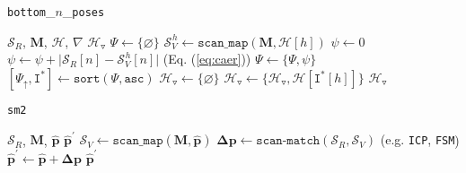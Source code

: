 \begin{algorithm}
  \caption{\texttt{bottom}\_$n$\_\texttt{poses}}
  \begin{spacing}{1.2}
  \begin{algorithmic}[1]
    \REQUIRE $\mathcal{S}_R$, $\bm{M}$, $\mathcal{H}$, $\nabla$
    \ENSURE $\mathcal{H}_{\triangledown}$
    \STATE $\Psi \leftarrow \{\varnothing \}$
      \STATE $\mathcal{S}_V^{\hspace{1pt} h} \leftarrow \texttt{scan\_map}(\bm{M}, \mathcal{H}[h])$
      \STATE $\psi \leftarrow 0$
        \STATE $\psi \leftarrow \psi + \big|\mathcal{S}_R[n]-\mathcal{S}_V^{\hspace{1pt} h}[n]\big|$ \hfill {\small (Eq. (\ref{eq:caer})})
      \ENDFOR
      \STATE $\Psi \leftarrow \{\Psi, \psi\}$
    \ENDFOR
    \STATE $[\Psi_{\uparrow}, \texttt{I}^{\ast}] \leftarrow \texttt{sort}(\Psi, \texttt{asc})$
    \STATE $\mathcal{H}_{\triangledown} \leftarrow \{\varnothing \}$
      \STATE $\mathcal{H}_{\triangledown} \leftarrow \{\mathcal{H}_{\triangledown}, \mathcal{H}[\texttt{I}^{\ast}[h]]\}$
    \ENDFOR
    \RETURN $\mathcal{H}_{\triangledown}$
  \end{algorithmic}
  \end{spacing}
  \label{alg:algorithm_bottom_n}
\end{algorithm}

\begin{algorithm}
  \caption{\texttt{sm2}}
  \begin{spacing}{1.2}
  \begin{algorithmic}[1]
    \REQUIRE $\mathcal{S}_R$, $\bm{M}$, $\hat{\bm{p}}$
    \ENSURE $\hat{\bm{p}}^\prime$
    \STATE $\mathcal{S}_V \leftarrow \texttt{scan\_map}(\bm{M}, \hat{\bm{p}})$
    \STATE $\bm{\Delta p} \leftarrow \texttt{scan-match}(\mathcal{S}_R,\mathcal{S}_V)$ \hfill {\small (e.g. \texttt{ICP}\cite{kissicp}, \texttt{FSM}\cite{fsm}})
    \STATE $\hat{\bm{p}}^\prime \leftarrow \hat{\bm{p}} + \bm{\Delta p}$
    \RETURN $\hat{\bm{p}}^\prime$
  \end{algorithmic}
  \end{spacing}
  \label{alg:algorithm_sm2}
\end{algorithm}
